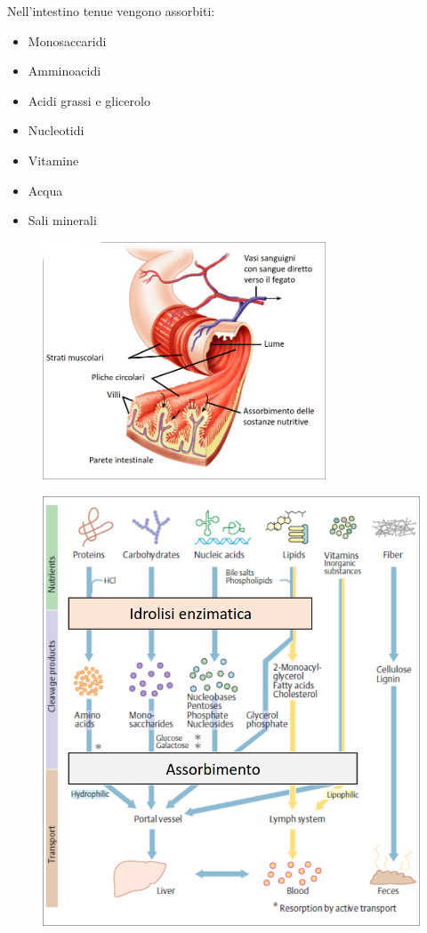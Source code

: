 \documentclass[a4paper]{article}
\begin{document}
Nell'intestino tenue vengono assorbiti:

\begin{itemize}
   \item Monosaccaridi
   \item Amminoacidi
   \item Acidi grassi e glicerolo
   \item Nucleotidi
   \item Vitamine
   \item Acqua
   \item Sali minerali
\end{itemize}

\begin{figure}[th]
    \centering
    \includegraphics[width=0.75\textwidth]{./intestino.png}
\end{figure}

\pagebreak

\begin{figure}[th]
    \centering
    \includegraphics[width=\textwidth]{./assorbimento.png}
\end{figure}
\end{document}

